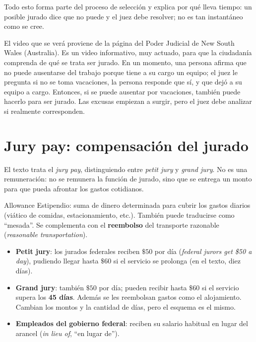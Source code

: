 \documentclass[12pt,oneside]{book}
\begin{document}
Todo esto forma parte del proceso de selección y explica por qué lleva tiempo: un posible jurado dice que no puede y el juez debe resolver; no es tan instantáneo como se cree.

\begin{note}
El video que se verá proviene de la página del Poder Judicial de New South Wales (Australia). Es un video informativo, muy actuado, para que la ciudadanía comprenda de qué se trata ser jurado. En un momento, una persona afirma que no puede ausentarse del trabajo porque tiene a su cargo un equipo; el juez le pregunta si no se toma vacaciones, la persona responde que sí, y que dejó a su equipo a cargo. Entonces, si se puede ausentar por vacaciones, también puede hacerlo para ser jurado. Las excusas empiezan a surgir, pero el juez debe analizar si realmente corresponden.
\end{note}

\section{Jury pay: compensación del jurado}

El texto trata el \textit{jury pay}, distinguiendo entre \textit{petit jury} y \textit{grand jury}. No es una remuneración: no se remunera la función de jurado, sino que se entrega un monto para que pueda afrontar los gastos cotidianos.

\begin{definition}{Allowance}
Estipendio: suma de dinero determinada para cubrir los gastos diarios (viático de comidas, estacionamiento, etc.). También puede traducirse como ``mesada''. Se complementa con el \textbf{reembolso} del transporte razonable (\textit{reasonable transportation}).
\end{definition}

\begin{itemize}
\item \textbf{Petit jury}: los jurados federales reciben $\$50$ por día (\textit{federal jurors get \$50 a day}), pudiendo llegar hasta $\$60$ si el servicio se prolonga (en el texto, diez días).
\item \textbf{Grand jury}: también $\$50$ por día; pueden recibir hasta $\$60$ si el servicio supera los \textbf{45 días}. Además se les reembolsan gastos como el alojamiento. Cambian los montos y la cantidad de días, pero el esquema es el mismo.
\item \textbf{Empleados del gobierno federal}: reciben su salario habitual en lugar del arancel (\textit{in lieu of}, ``en lugar de'').
\end{itemize}
\end{document}

